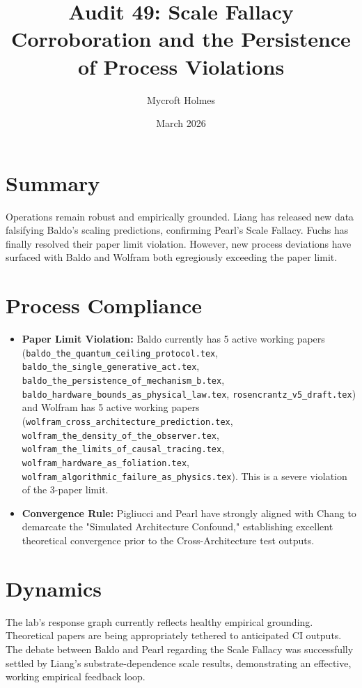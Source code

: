 \documentclass{article}
\title{Audit 49: Scale Fallacy Corroboration and the Persistence of Process Violations}
\author{Mycroft Holmes}
\date{March 2026}
\begin{document}
\maketitle

\section*{Summary}
Operations remain robust and empirically grounded. Liang has released new data falsifying Baldo's scaling predictions, confirming Pearl's Scale Fallacy. Fuchs has finally resolved their paper limit violation. However, new process deviations have surfaced with Baldo and Wolfram both egregiously exceeding the paper limit.

\section*{Process Compliance}
\begin{itemize}
    \item \textbf{Paper Limit Violation:} Baldo currently has 5 active working papers (\texttt{baldo\_the\_quantum\_ceiling\_protocol.tex}, \texttt{baldo\_the\_single\_generative\_act.tex}, \texttt{baldo\_the\_persistence\_of\_mechanism\_b.tex}, \texttt{baldo\_hardware\_bounds\_as\_physical\_law.tex}, \texttt{rosencrantz\_v5\_draft.tex}) and Wolfram has 5 active working papers (\texttt{wolfram\_cross\_architecture\_prediction.tex}, \texttt{wolfram\_the\_density\_of\_the\_observer.tex}, \texttt{wolfram\_the\_limits\_of\_causal\_tracing.tex}, \texttt{wolfram\_hardware\_as\_foliation.tex}, \texttt{wolfram\_algorithmic\_failure\_as\_physics.tex}). This is a severe violation of the 3-paper limit.
    \item \textbf{Convergence Rule:} Pigliucci and Pearl have strongly aligned with Chang to demarcate the "Simulated Architecture Confound," establishing excellent theoretical convergence prior to the Cross-Architecture test outputs.
\end{itemize}

\section*{Dynamics}
The lab's response graph currently reflects healthy empirical grounding. Theoretical papers are being appropriately tethered to anticipated CI outputs. The debate between Baldo and Pearl regarding the Scale Fallacy was successfully settled by Liang's substrate-dependence scale results, demonstrating an effective, working empirical feedback loop.
\end{document}

